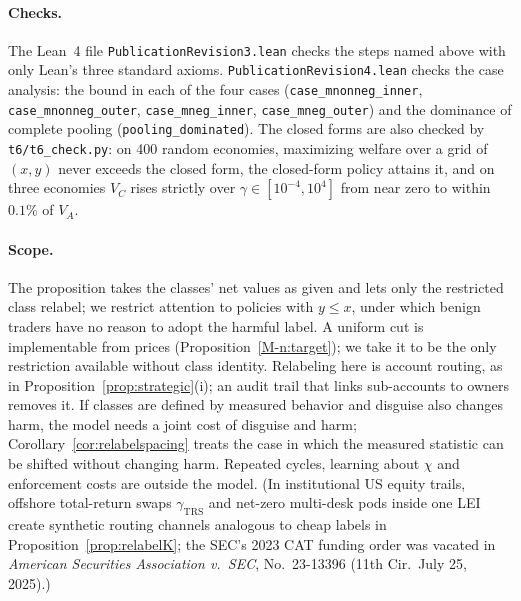 \documentclass[12pt]{article}
\theoremstyle{definition}
\theoremstyle{remark}
\begin{document}
\paragraph{Checks.} The Lean~4 file \nolinkurl{PublicationRevision3.lean} checks the steps named above with only Lean's three standard axioms. \nolinkurl{PublicationRevision4.lean} checks the case analysis: the bound in each of the four cases (\nolinkurl{case_mnonneg_inner}, \nolinkurl{case_mnonneg_outer}, \nolinkurl{case_mneg_inner}, \nolinkurl{case_mneg_outer}) and the dominance of complete pooling (\nolinkurl{pooling_dominated}). The closed forms are also checked by \nolinkurl{t6/t6_check.py}: on 400 random economies, maximizing welfare over a grid of $(x,y)$ never exceeds the closed form, the closed-form policy attains it, and on three economies $V_C$ rises strictly over $\gamma\in[10^{-4},10^4]$ from near zero to within $0.1\%$ of $V_A$.

\paragraph{Scope.} The proposition takes the classes' net values as given and lets only the restricted class relabel; we restrict attention to policies with $y\le x$, under which benign traders have no reason to adopt the harmful label. A uniform cut is implementable from prices (Proposition~\ref{M-n:target}); we take it to be the only restriction available without class identity. Relabeling here is account routing, as in Proposition~\ref{prop:strategic}(i); an audit trail that links sub-accounts to owners removes it. If classes are defined by measured behavior and disguise also changes harm, the model needs a joint cost of disguise and harm; Corollary~\ref{cor:relabelspacing} treats the case in which the measured statistic can be shifted without changing harm. Repeated cycles, learning about $\chi$ and enforcement costs are outside the model. (In institutional US equity trails, offshore total-return swaps $\gamma_{\mathrm{TRS}}$ and net-zero multi-desk pods inside one LEI create synthetic routing channels analogous to cheap labels in Proposition~\ref{prop:relabelK}; the SEC's 2023 CAT funding order was vacated in \emph{American Securities Association v.\ SEC}, No.~23-13396 (11th Cir.\ July 25, 2025).)
\end{document}

